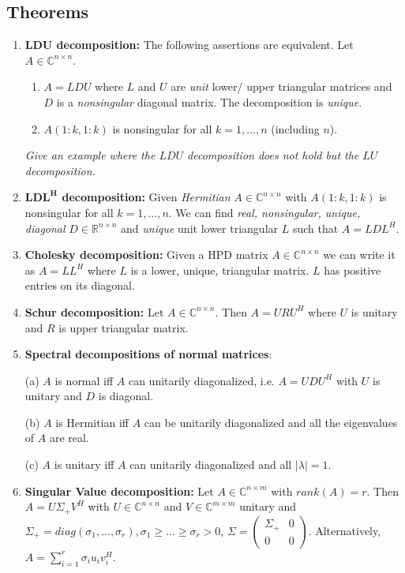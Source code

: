 \documentclass[a4paper, landscape,twocolumn,fontsize=9pt]{scrartcl}
\begin{document}
\subsection*{Theorems}
\begin{enumerate}
    \item \textbf{LDU decomposition:} The following assertions are equivalent. Let $A \in \mathbb C^{n \times n}$.
    \begin{enumerate}
        \item $A = LDU$ where $L$ and $U$ are \emph{unit} lower/ upper triangular matrices and $D$ is a \emph{nonsingular} diagonal matrix. The decomposition is \emph{unique}.
        
        \item $A(1:k, 1:k)$ is nonsingular for all $k = 1,...,n$ (including $n$).
    \end{enumerate}
    \textit{Give an example where the $LDU$ decomposition does not hold but the $LU$ decomposition.}
    \item \textbf{$\mathbf{LDL^H}$ decomposition:} Given \emph{Hermitian} $A \in \mathbb C^{n \times n}$ with $A(1:k,1:k)$ is nonsingular for all $k = 1,...,n$. We can find \emph{real, nonsingular, unique, diagonal} $D \in \mathbb R^{n \times n}$ and \emph{unique} unit lower triangular $L$ such that $A = LDL^H$.
    \item \textbf{Cholesky decomposition:} Given a HPD matrix $A \in \mathbb C^{n \times n}$ we can write it as $A = LL^H$ where $L$ is a lower, unique, triangular matrix. $L$ has positive entries on its diagonal.
    \item \textbf{Schur decomposition:} Let $A \in \mathbb C^{n \times n}$. Then $A = URU^H$ where $U$ is unitary and $R$ is upper triangular matrix.
    \item \textbf{Spectral decompositions of normal matrices}:
    
    	(a) $A$ is normal iff $A$ can unitarily diagonalized, i.e. $A = UDU^H$ with $U$ is unitary and $D$ is diagonal.
    	
    	(b) $A$ is Hermitian iff $A$ can be unitarily diagonalized and all the eigenvalues of $A$ are real.
    	
    	(c) $A$ is unitary iff $A$ can unitarily diagonalized and all $|\lambda | = 1$.
    
	\item \textbf{Singular Value decomposition:} Let $A \in \mathbb C^{n \times m}$ with $rank(A) = r$. Then $A = U\Sigma_+ V^H$ with $U \in \mathbb C^{n \times n}$ and $V \in \mathbb C^{m \times m}$ unitary and $\Sigma_+ = diag(\sigma_1,...,\sigma_r), \sigma_1 \geq ... \geq \sigma_r > 0$, $\Sigma = \begin{pmatrix}
			\Sigma_+ & 0 \\ 0 & 0
	\end{pmatrix}$. Alternatively, $A = \sum^r_{i = 1} \sigma_i u_i  v_i^H$.
\end{enumerate}
\end{document}
